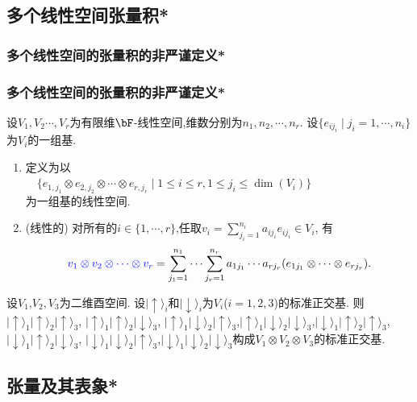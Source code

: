 \subsection{多个线性空间张量积*}

\subsubsection{多个线性空间的张量积的非严谨定义*}
\begin{frame}\frametitle{多个线性空间的张量积的非严谨定义*}
\begin{proposition}[多个线性空间张量积]
设$V_1,V_2\cdots,V_r$为有限维$\bF$-线性空间,维数分别为$n_1,n_2,\cdots,n_r$.
\pp
设$\{e_{ij_i}\mid j_i=1,\cdots,n_i\}$为$V_i$的一组基.
\pp
\begin{enumerate}
\item {} 定义为以\\
$\quad \{e_{1,j_1}\otimes e_{2,j_2} \otimes \cdots \otimes e_{r,j_r} \mid 1\leq i \leq r, 1\leq j_i \leq \dim(V_i)\}$\\
为一组基的线性空间.
\pp
\item (线性的) 对所有的$i\in \{1,\cdots,r\}$,任取$v_i=\sum_{j_i=1}^{n_i} a_{ij_i} e_{ij_i}\in V_i$, 有
\[\blue{v_1\otimes v_2\otimes \cdots \otimes v_r} = \sum_{j_1=1}^{n_1} \cdots  \sum_{j_r=1}^{n_r} a_{1j_1} \cdots a_{rj_r} (e_{1j_1}\otimes \cdots\otimes e_{rj_r}).\]
\end{enumerate}
\end{proposition}
\pp

\def\up{\lvert\uparrow\rangle}
\def\dn{\lvert\downarrow\rangle}
\begin{example}
设$V_1$,$V_2,V_3$为二维酉空间. 设$\up_i$和$\dn_i$为$V_i$($i=1,2,3$)的标准正交基. 则$\up_1\up_2\up_3$, $\up_1\up_2\dn_3$, $\up_1\dn_2\up_3$,$\up_1\dn_2\dn_3$,$\dn_1\up_2\up_3$, $\dn_1\up_2\dn_3$, $\dn_1\dn_2\up_3$,$\dn_1\dn_2\dn_3$构成$V_1\otimes V_2\otimes V_3$的标准正交基.
\end{example}
\end{frame}



\subsection{张量及其表象*}


